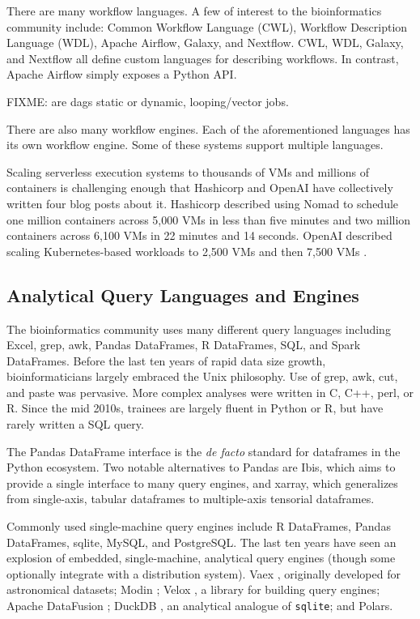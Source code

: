 \documentclass[sigconf, nonacm]{acmart}
\begin{document}

There are many workflow languages. A few of interest to the bioinformatics community include: Common
Workflow Language (CWL), Workflow Description Language (WDL), Apache Airflow, Galaxy, and
Nextflow. CWL, WDL, Galaxy, and Nextflow all define custom languages for describing workflows. In
contrast, Apache Airflow simply exposes a Python API.

FIXME: are dags static or dynamic, looping/vector jobs.

There are also many workflow engines. Each of the aforementioned languages has its own workflow
engine. Some of these systems support multiple languages.

Scaling serverless execution systems to thousands of VMs and millions of containers is challenging
enough that Hashicorp and OpenAI have collectively written four blog posts about it. Hashicorp
described using Nomad to schedule one million containers across 5,000 VMs in less than five minutes
\cite{hashicorp1m} and two million containers across 6,100 VMs in 22 minutes and 14 seconds. OpenAI
described scaling Kubernetes-based workloads to 2,500 VMs \cite{openai2500} and then 7,500 VMs
\cite{openai7500}.

\subsection{Analytical Query Languages and Engines}

The bioinformatics community uses many different query languages including Excel, grep, awk, Pandas
DataFrames, R DataFrames, SQL, and Spark DataFrames. Before the last ten years of rapid data size
growth, bioinformaticians largely embraced the Unix philosophy. Use of grep, awk, cut, and paste was
pervasive. More complex analyses were written in C, C++, perl, or R. Since the mid 2010s, trainees
are largely fluent in Python or R, but have rarely written a SQL query.

The Pandas DataFrame interface is the \emph{de facto} standard for dataframes in the Python
ecosystem. Two notable alternatives to Pandas are Ibis, which aims to provide a single interface to
many query engines, and xarray, which generalizes from single-axis, tabular dataframes to
multiple-axis tensorial dataframes.

Commonly used single-machine query engines include R DataFrames, Pandas DataFrames, sqlite, MySQL,
and PostgreSQL. The last ten years have seen an explosion of embedded, single-machine, analytical
query engines (though some optionally integrate with a distribution system). Vaex \cite{vaex},
originally developed for astronomical datasets; Modin \cite{modin}; Velox \cite{velox}, a library
for building query engines; Apache DataFusion \cite{datafusion}; DuckDB \cite{duckdb}, an analytical
analogue of \texttt{sqlite}; and Polars.
\end{document}
